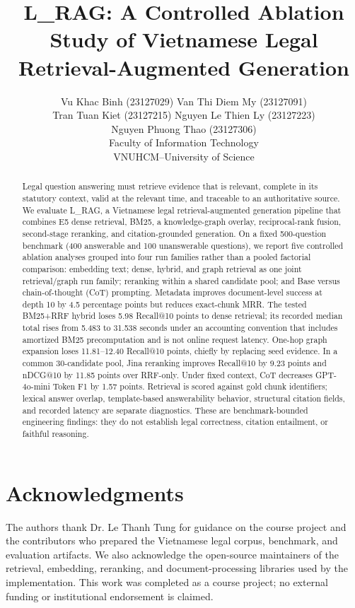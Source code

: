 \documentclass[11pt]{article}
\title{L\_RAG: A Controlled Ablation Study of Vietnamese Legal
Retrieval-Augmented Generation}
\author{
  Vu Khac Binh (23127029) \quad Van Thi Diem My (23127091) \\
  Tran Tuan Kiet (23127215) \quad Nguyen Le Thien Ly (23127223) \\
  Nguyen Phuong Thao (23127306) \\
  Faculty of Information Technology\\
  VNUHCM--University of Science
}
\begin{document}
\pagestyle{plain}
\maketitle

\begin{abstract}
Legal question answering must retrieve evidence that is relevant, complete in
its statutory context, valid at the relevant time, and traceable to an
authoritative source. We evaluate L\_RAG, a Vietnamese legal
retrieval-augmented generation pipeline that combines E5 dense retrieval,
BM25, a knowledge-graph overlay, reciprocal-rank fusion, second-stage
reranking, and citation-grounded generation. On a fixed 500-question
benchmark (400 answerable and 100 unanswerable questions), we report five
controlled ablation analyses grouped into four run families rather than a
pooled factorial comparison: embedding text; dense, hybrid, and graph
retrieval as one joint retrieval/graph run family; reranking within a shared
candidate pool; and Base versus chain-of-thought (CoT) prompting. Metadata
improves document-level success at depth 10 by 4.5 percentage points but
reduces exact-chunk MRR. The tested BM25+RRF hybrid loses 5.98 Recall@10
points to dense retrieval; its recorded median total rises from 5.483 to
31.538 seconds under an accounting convention that includes amortized BM25
precomputation and is not online request latency. One-hop graph expansion
loses 11.81--12.40 Recall@10 points, chiefly by replacing seed evidence. In a
common 30-candidate pool, Jina
reranking improves Recall@10 by 9.23 points and nDCG@10 by 11.85 points over
RRF-only. Under fixed context, CoT decreases GPT-4o-mini Token F1 by 1.57
points. Retrieval is scored against gold chunk identifiers; lexical answer
overlap, template-based answerability behavior, structural citation fields,
and recorded latency are separate diagnostics. These are benchmark-bounded
engineering findings: they do not establish legal correctness, citation
entailment, or faithful reasoning.
\end{abstract}










\section*{Acknowledgments}
The authors thank Dr. Le Thanh Tung for guidance on the course project and
the contributors who prepared the Vietnamese legal corpus, benchmark, and
evaluation artifacts. We also acknowledge the open-source maintainers of the
retrieval, embedding, reranking, and document-processing libraries used by
the implementation. This work was completed as a course project; no external
funding or institutional endorsement is claimed.




\end{document}
